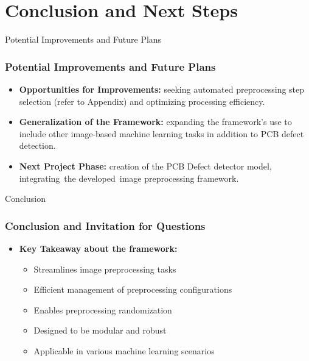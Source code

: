 \section{Conclusion and Next Steps}
\label{conclusion_section}


\begin{frame}{Potential Improvements and Future Plans}
    \frametitle{Potential Improvements and Future Plans}
    \begin{itemize}
        \item \textbf{Opportunities for Improvements:} seeking automated preprocessing step selection (refer to Appendix) and optimizing processing efficiency.
        \item \textbf{Generalization of the Framework:} expanding the framework's use to include other image-based machine learning tasks in addition to PCB defect detection.
        \item \textbf{Next Project Phase:} creation of the PCB Defect detector model, integrating the developed image preprocessing framework.
    \end{itemize}
\end{frame}

\begin{frame}{Conclusion}
    \frametitle{Conclusion and Invitation for Questions}
    \begin{itemize}
        \item \textbf{Key Takeaway about the framework:}
        \vspace{1em}
        \begin{itemize}
            \item Streamlines image preprocessing tasks
            \vspace{0.5em}
            \item Efficient management of preprocessing configurations
            \vspace{0.5em}
            \item Enables preprocessing randomization
            \vspace{0.5em}
            \item Designed to be modular and robust
            \vspace{0.5em}
            \item Applicable in various machine learning scenarios
        \end{itemize}
    \end{itemize}
\end{frame}
